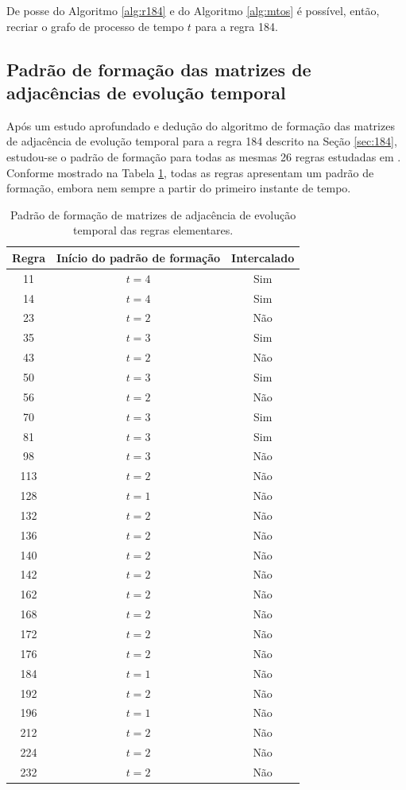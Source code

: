 \documentclass[12pt,a4paper]{article}
\begin{document}
De posse do Algoritmo \ref{alg:r184} e do Algoritmo \ref{alg:mtos} é
possível, então, recriar o grafo de processo de tempo $t$ para a regra 184.

\subsection{Padrão de formação das matrizes de adjacências de evolução temporal}\label{sec:pattern}

Após um estudo aprofundado e dedução do algoritmo de formação das matrizes
de adjacência de evolução temporal para a regra 184 descrito na Seção \ref{sec:184},
estudou-se o padrão de formação para todas as mesmas 26 regras estudadas em
. Conforme mostrado na Tabela \ref{tab:pattern},
todas as regras apresentam um padrão de formação, embora nem sempre a
partir do primeiro instante de tempo.

\begin{table}[htp]
\begin{center}
\begin{tabular}{c c c}
\hline
\textbf{Regra} & \textbf{Início do padrão de formação} & \textbf{Intercalado}\\ \hline
 11 & $t=4$ & Sim \\
 14 & $t=4$ & Sim \\
 23 & $t=2$ & Não \\
 35 & $t=3$ & Sim \\
 43 & $t=2$ & Não \\
 50 & $t=3$ & Sim \\
 56 & $t=2$ & Não \\
 70 & $t=3$ & Sim \\
 81 & $t=3$ & Sim \\
 98 & $t=3$ & Não \\
113 & $t=2$ & Não \\
128 & $t=1$ & Não \\
132 & $t=2$ & Não \\
136 & $t=2$ & Não \\
140 & $t=2$ & Não \\
142 & $t=2$ & Não \\
162 & $t=2$ & Não \\
168 & $t=2$ & Não \\
172 & $t=2$ & Não \\
176 & $t=2$ & Não \\
184 & $t=1$ & Não \\
192 & $t=2$ & Não \\
196 & $t=1$ & Não \\
212 & $t=2$ & Não \\
224 & $t=2$ & Não \\
232 & $t=2$ & Não \\
\end{tabular}
\caption{Padrão de formação de matrizes de adjacência de evolução temporal das
regras elementares.}
\label{tab:pattern}
\end{center}
\end{table}
\end{document}
